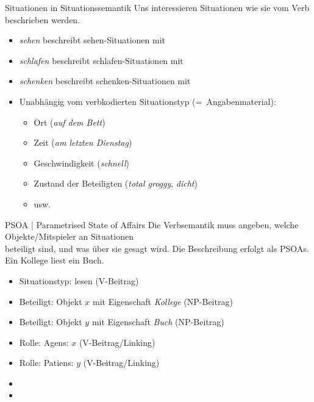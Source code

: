 \begin{frame}
  {Situationen in Situationssemantik}
  \onslide<+->
  \onslide<+->
  Uns interessieren \alert{Situationen wie sie vom Verb beschrieben werden}.\\
  \Zeile
  \begin{itemize}[<+->]
    \item \textit{sehen} beschreibt \alert{sehen-Situationen} mit 
    \item \textit{schlafen} beschreibt \alert{schlafen-Situationen} mit 
    \item \textit{schenken} beschreibt \alert{schenken-Situationen} mit 
      \Halbzeile
    \item Unabhängig vom verbkodierten Situationstyp (=~Angabenmaterial):
      \begin{itemize}[<+->]
        \item Ort (\textit{auf dem Bett})
        \item Zeit (\textit{am letzten Dienstag})
        \item Geschwindigkeit (\textit{schnell})
        \item Zustand der Beteiligten (\textit{total groggy}, \textit{dicht})
        \item usw.
      \end{itemize}
  \end{itemize}
\end{frame}

\begin{frame}
  {PSOA | Parametrised State of Affairs}
  \onslide<+->
  \onslide<+->
  Die Verbsemantik muss angeben, welche Objekte\slash Mitspieler an Situationen\\
  beteiligt sind, und was über sie gesagt wird. Die Beschreibung erfolgt als PSOAs.\\
  \onslide<+->
  \Zeile
  \alert{Ein Kollege liest ein Buch.}\\
  \Halbzeile
  \begin{itemize}[<+->]
    \item Situationstyp: \alert{lesen} (V-Beitrag)
    \item Beteiligt: \alert{Objekt $x$ mit Eigenschaft \textit{Kollege}} (NP-Beitrag)
    \item Beteiligt: \alert{Objekt $y$ mit Eigenschaft \textit{Buch}} (NP-Beitrag)
    \item Rolle: \alert{Agens: $x$} (V-Beitrag/Linking)
    \item Rolle: \alert{Patiens: $y$} (V-Beitrag/Linking)
      \Halbzeile
    \item {}
    \item {}
  \end{itemize}
\end{frame}

